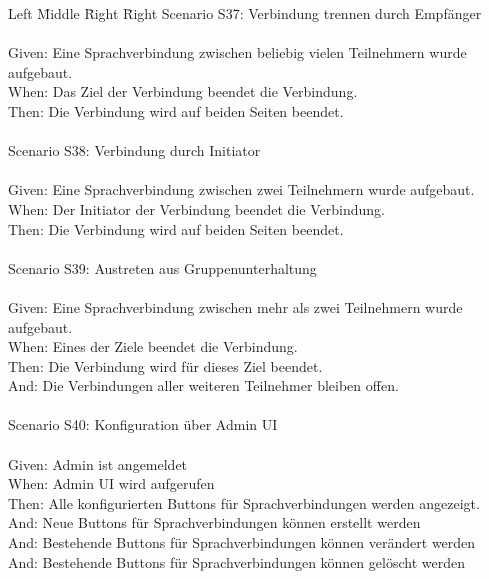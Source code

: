 \begin{tabbing}
    Left \= Middle \= Right \= Right \kill
    Scenario S37: \> \> \> Verbindung trennen durch Empfänger \\ \\
    Given:  \> \> \> Eine Sprachverbindung zwischen beliebig vielen Teilnehmern wurde aufgebaut. \\
    When:   \> \> \> Das Ziel der Verbindung beendet die Verbindung. \\
    Then:   \> \> \> Die Verbindung wird auf beiden Seiten beendet.\\
    \\
    Scenario S38: \> \> \> Verbindung durch Initiator \\ \\
    Given:  \> \> \> Eine Sprachverbindung zwischen zwei Teilnehmern wurde aufgebaut. \\
    When:   \> \> \> Der Initiator der Verbindung beendet die Verbindung. \\
    Then:   \> \> \> Die Verbindung wird auf beiden Seiten beendet.\\
    \\
    Scenario S39: \> \> \> Austreten aus Gruppenunterhaltung \\ \\
    Given:  \> \> \> Eine Sprachverbindung zwischen mehr als zwei Teilnehmern wurde aufgebaut. \\
    When:   \> \> \> Eines der Ziele beendet die Verbindung. \\
    Then:   \> \> \> Die Verbindung wird für dieses Ziel beendet.\\
    And:   \> \> \> Die Verbindungen aller weiteren Teilnehmer bleiben offen.\\
    \\
    Scenario S40: \> \> \> Konfiguration über Admin UI \\ \\
    Given: \> \> \>  Admin ist angemeldet\\
    When: \> \> \>  Admin UI wird aufgerufen\\
    Then: \> \> \>  Alle konfigurierten Buttons für Sprachverbindungen werden angezeigt.\\
    And: \> \> \>  Neue Buttons für Sprachverbindungen können erstellt werden\\
    And: \> \> \>  Bestehende Buttons für Sprachverbindungen können verändert werden\\
    And: \> \> \>  Bestehende Buttons für Sprachverbindungen können gelöscht werden\\
    \\
\end{tabbing}
\clearpage
